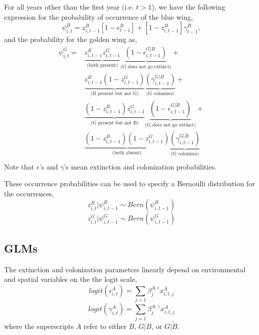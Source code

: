 \documentclass{article}
\begin{document}
For all years other than the first year (i.e. $t > 1$), we have the
following expression for the probability of occurrence of the blue
wing,
\begin{equation}
  \label{eq:6}
  \psi_{i,t}^B = z_{i,t-1}^B [1-\epsilon_{t-1}^B] + [1-z_{i,t-1}^B] \gamma_{t-1}^B,
\end{equation}
and the probability for the golden wing as,
\begin{equation}
  \label{eq:8}
  \begin{split}
    \psi_{i,t}^G = & \underbrace{z_{i,t-1}^B z_{i,t-1}^G}_{\text{(both
        present)}}
    \underbrace{(1-\epsilon_{i,t-1}^{G|B})}_{\text{(G does not go extinct)}} + \\
    & \underbrace{z_{i,t-1}^B (1-z_{i,t-1}^G)}_{\text{(B present but not G)}}
    \underbrace{(\gamma_{i,t-1}^{G|B})}_{\text{(G colonizes)}} + \\
      & \underbrace{(1-z_{i,t-1}^B) z_{i,t-1}^G}_{\text{(G present but
          not B)}}
      \underbrace{(1-\epsilon_{i,t-1}^{G|\tilde{B}})}_{\text{(G does not go extinct)}} +\\
      & \underbrace{(1-z_{i,t-1}^B)(1-z_{i,t-1}^G)}_{\text{(both absent)}}
      \underbrace{(\gamma_{i,t-1}^{G|\tilde{B}})}_{\text{(G colonizes)}} \\
  \end{split}
\end{equation}
Note that $\epsilon$'s and $\gamma$'s mean extinction and colonization
probabilities.

These occurrence probabilities can be used to specify a Bernoulli
distribution for the occurrences,
\begin{equation}
  \label{eq:1}
  z_{i,t}^B | \psi_{i,t-1}^B \sim Bern(\psi_{i,t-1}^B)
\end{equation}
\begin{equation}
  \label{eq:2}
  z_{i,t}^G | \psi_{i,t-1}^G \sim Bern(\psi_{i,t-1}^G)
\end{equation}


\subsection{GLMs}

The extinction and colonization parameters linearly depend on
environmental and spatial variables on the the logit scale,
\begin{equation}
  \label{eq:7}
  logit(\epsilon_{i, t}^A) = \sum_{j=1} \beta_j^{A,\epsilon} x_{i, t, j}^A
\end{equation}
\begin{equation}
  \label{eq:7}
  logit(\gamma_{i, t}^A) = \sum_{j=1} \beta_j^{A,\gamma} x_{i, t, j}^A
\end{equation}
where the superscripts $A$ refer to either $B$, $G|B$, or $G|\tilde{B}$.
\end{document}
